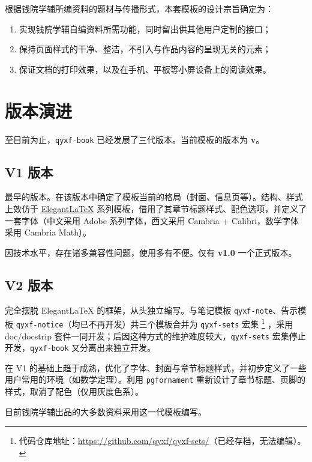 \documentclass[
  10pt,
  twoside,
  openany,
  b5paper, %
  colorscheme = rbb, %
  xits = false,
]{qyxf-book}
\begin{document}
根据钱院学辅所编资料的题材与传播形式，本套模板的设计宗旨确定为：
\begin{enumerate}
  \item 实现钱院学辅自编资料所需功能，同时留出供其他用户定制的接口；
  \item 保持页面样式的干净、整洁，不引入与作品内容的呈现无关的元素；
  \item 保证文档的打印效果，以及在手机、平板等小屏设备上的阅读效果。
\end{enumerate}

\section{版本演进}

至目前为止，\verb|qyxf-book| 已经发展了三代版本。当前模板的版本为 \textbf{v\styversion}。

\subsection{V1 版本}
最早的版本。在该版本中确定了模板当前的格局（封面、信息页等）。结构、样式上效仿于 \href{https://elegantlatex.org/}{Elegant\LaTeX} 系列模板，借用了其章节标题样式、配色选项，并定义了一套字体（中文采用 Adobe 系列字体，西文采用 Cambria + Calibri，数学字体采用 Cambria Math）。

因技术水平，存在诸多兼容性问题，使用多有不便。仅有 \textbf{v1.0} 一个正式版本。

\subsection{V2 版本}

完全摆脱 Elegant\LaTeX{} 的框架，从头独立编写。与笔记模板 \verb|qyxf-note|、告示模板 \verb|qyxf-notice|（均已不再开发）共三个模板合并为 \verb|qyxf-sets| 宏集
\footnote{代码仓库地址：\url{https://github.com/qyxf/qyxf-sets/}（已经存档，无法编辑）。}
，采用 doc/docstrip 套件一同开发；后因这种方式的维护难度较大，\verb|qyxf-sets| 宏集停止开发，\verb|qyxf-book| 又分离出来独立开发。

在 V1 的基础上趋于成熟，优化了字体、封面与章节标题样式，并初步定义了一些用户常用的环境（如数学定理）。利用 \verb|pgfornament| 重新设计了章节标题、页脚的样式，取消了配色（仅用灰度色系）。

目前钱院学辅出品的大多数资料采用这一代模板编写。
\end{document}
